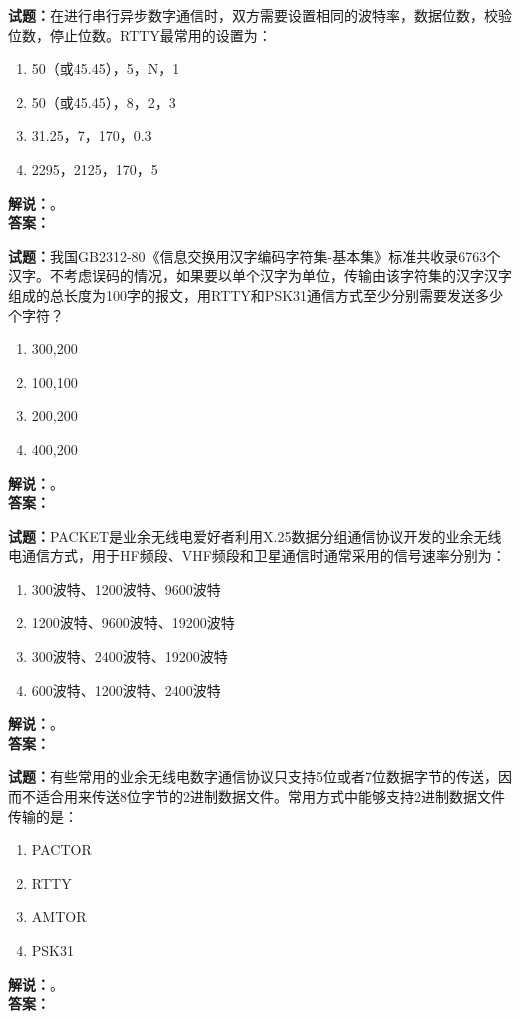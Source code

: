 \documentclass{ctexbook}
\begin{document}
\noindent\textbf{试题：}在进行串行异步数字通信时，双方需要设置相同的波特率，数据位数，校验位数，停止位数。RTTY最常用的设置为：
\begin{enumerate}[leftmargin=3em]
  \item 50（或45.45），5，N，1
  \item 50（或45.45），8，2，3
  \item 31.25，7，170，0.3
  \item 2295，2125，170，5
\end{enumerate}
\noindent\textbf{解说：}\textbf{}。\\\noindent\textbf{答案：}

\vspace{\baselineskip}

\noindent\textbf{试题：}我国GB2312-80《信息交换用汉字编码字符集-基本集》标准共收录6763个汉字。不考虑误码的情况，如果要以单个汉字为单位，传输由该字符集的汉字汉字组成的总长度为100字的报文，用RTTY和PSK31通信方式至少分别需要发送多少个字符？
\begin{enumerate}[leftmargin=3em]
  \item 300,200
  \item 100,100
  \item 200,200
  \item 400,200
\end{enumerate}
\noindent\textbf{解说：}\textbf{}。\\\noindent\textbf{答案：}

\vspace{\baselineskip}

\noindent\textbf{试题：}PACKET是业余无线电爱好者利用X.25数据分组通信协议开发的业余无线电通信方式，用于HF频段、VHF频段和卫星通信时通常采用的信号速率分别为：
\begin{enumerate}[leftmargin=3em]
  \item 300波特、1200波特、9600波特
  \item 1200波特、9600波特、19200波特
  \item 300波特、2400波特、19200波特
  \item 600波特、1200波特、2400波特
\end{enumerate}
\noindent\textbf{解说：}\textbf{}。\\\noindent\textbf{答案：}

\vspace{\baselineskip}

\noindent\textbf{试题：}有些常用的业余无线电数字通信协议只支持5位或者7位数据字节的传送，因而不适合用来传送8位字节的2进制数据文件。常用方式中能够支持2进制数据文件传输的是：
\begin{enumerate}[leftmargin=3em]
  \item PACTOR
  \item RTTY
  \item AMTOR
  \item PSK31
\end{enumerate}
\noindent\textbf{解说：}\textbf{}。\\\noindent\textbf{答案：}
\end{document}
